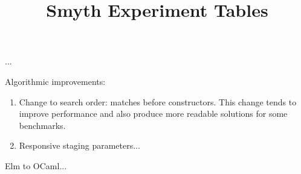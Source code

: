 \documentclass[acmsmall,nonacm]{acmart}
\begin{document}
\title{Smyth Experiment Tables}
\maketitle

...

Algorithmic improvements:

\begin{enumerate}

\item Change to search order: matches before constructors. This change tends to
improve performance and also produce more readable solutions for some
benchmarks.

\item Responsive staging parameters...

\end{enumerate}

Elm to OCaml...

\clearpage

\setcounter{figure}{9}

\setcounter{figure}{0}




\end{document}

